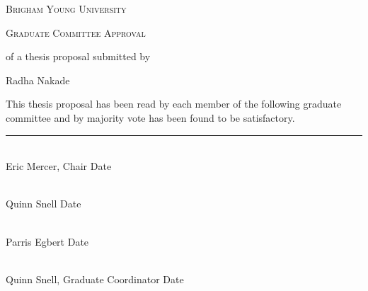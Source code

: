 \pagebreak

\begin{center}
\doublespacing

\textsc{Brigham Young University}

\textsc{Graduate Committee Approval}

of a thesis proposal submitted by

Radha Nakade
\end{center}

\noindent This thesis proposal has been read by each member of the
following graduate committee and by majority vote has been found to be
satisfactory.

\vspace{0.5cm}

\hrule

\vspace{0.5cm}

\newcommand{\signature}[1] {\vspace{1in} \noindent
\makebox[3.5in]{\hrulefill}  \hfill \makebox[2.5in]{\hrulefill}\\
\vspace{0.5cm} #1 \hfill Date \hspace{2in}}

\signature{Eric Mercer, Chair}

\signature{Quinn Snell }

\signature{Parris Egbert }

\signature{Quinn Snell, Graduate Coordinator}


